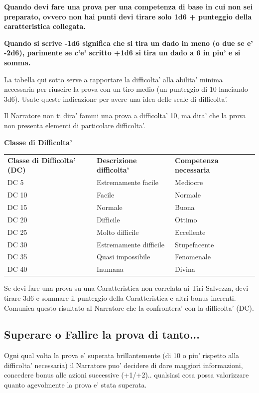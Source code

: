 \documentclass[a4paper,11pt,twoside,openany]{book}
\begin{document}
\bigskip

\textbf{Quando devi fare una prova per una competenza di base in cui non sei preparato, ovvero non hai punti devi tirare solo 1d6 + punteggio della caratteristica collegata.}

\textbf{Quando si scrive -1d6 significa che si tira un dado in meno (o due se e' -2d6), parimente se c'e' scritto +1d6 si tira un dado a 6 in piu' e si somma.}

\bigskip

La tabella qui sotto serve a rapportare la difficolta' alla abilita' minima necessaria per riuscire la prova con un tiro medio (un punteggio di 10 lanciando 3d6). Usate queste indicazione per avere una idea delle scale di difficolta'.

Il Narratore non ti dira' fammi una prova a difficolta' 10, ma dira' che la prova non presenta elementi di particolare difficolta'.

\bigskip

\textbf{Classe di Difficolta'}
\medskip

\begin{tabular}{lll}
\toprule
\textbf{Classe di Difficolta' (DC)} & \textbf{Descrizione difficolta'} &\textbf{ Competenza necessaria}\tabularnewline
DC 5 & Estremamente facile & Mediocre\tabularnewline
DC 10 & Facile & Normale\tabularnewline
DC 15 & Normale & Buona\tabularnewline
DC 20 & Difficile & Ottimo\tabularnewline
DC 25 & Molto difficile & Eccellente\tabularnewline
DC 30 & Estremamente difficile & Stupefacente\tabularnewline
DC 35 & Quasi impossibile & Fenomenale\tabularnewline
DC 40 & Inumana & Divina\tabularnewline

\end{tabular}

\bigskip

Se devi fare una prova su una Caratteristica non correlata ai Tiri Salvezza, devi tirare 3d6 e sommare il punteggio della Caratteristica e altri bonus inerenti. Comunica questo risultato al Narratore che la confrontera' con la difficolta' (DC).

\subsection{Superare o Fallire la prova di tanto...}

Ogni qual volta la prova e' superata brillantemente (di 10 o piu' rispetto alla difficolta' necessaria) il Narratore puo' decidere di dare maggiori informazioni, concedere bonus alle azioni successive (+1/+2).. qualsiasi cosa possa valorizzare quanto agevolmente la prova e' stata superata.
\end{document}
